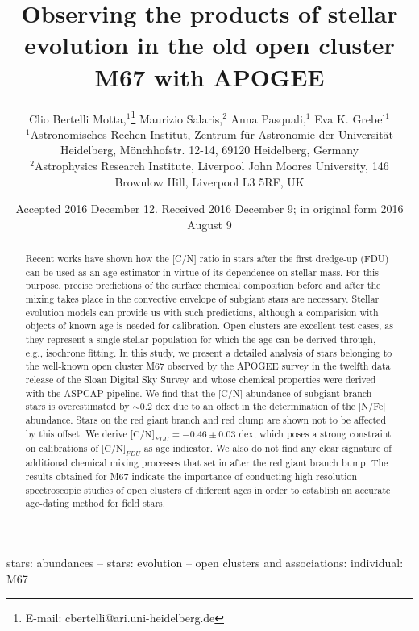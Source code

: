\documentclass[a4paper,fleqn,usenatbib]{mnras}
\title[Products of stellar evolution in M67]{Observing the products of stellar evolution in the old open cluster M67 with APOGEE}
\author[Bertelli Motta et al.]{
Clio Bertelli Motta,$^{1}$\thanks{E-mail: cbertelli@ari.uni-heidelberg.de}
Maurizio Salaris,$^{2}$
Anna Pasquali,$^{1}$
Eva K. Grebel$^{1}$
\\
$^{1}$Astronomisches Rechen-Institut, Zentrum f\"ur Astronomie der Universit\"at Heidelberg, M\"onchhofstr. 12-14, 69120 Heidelberg, Germany\\
$^{2}$Astrophysics Research Institute, Liverpool John Moores University, 146 Brownlow Hill, Liverpool L3 5RF, UK\\
}
\date{Accepted 2016 December 12. Received 2016 December 9; in original form 2016 August 9}
\begin{document}
\label{firstpage}
\pagerange{\pageref{firstpage}--\pageref{lastpage}}
\maketitle

\begin{abstract}
Recent works have shown how the [C/N] ratio in stars after the first dredge-up (FDU) can be used as an age estimator in virtue of its dependence on stellar mass. For this purpose, precise predictions of the surface chemical composition before and after the mixing takes place in the convective envelope of subgiant stars are necessary. Stellar evolution models can provide us with such predictions, although a comparision with objects of known age is needed for calibration. Open clusters are excellent test cases, as they represent a single stellar population for which the age can be derived through, e.g., isochrone fitting. In this study, we present a detailed analysis of stars belonging to the well-known open cluster M67 observed by the APOGEE survey in the twelfth data release of the Sloan Digital Sky Survey and whose chemical properties were derived with the ASPCAP pipeline. We find that the [C/N] abundance of subgiant branch stars is overestimated by $\sim0.2$ dex due to an offset in the determination of the [N/Fe] abundance. Stars on the red giant branch and red clump are shown not to be affected by this offset. We derive $\text{[C/N]}_{FDU}=-0.46\pm 0.03$ dex, which poses a strong constraint on calibrations of $\text{[C/N]}_{FDU}$
as age indicator. We also do not find any clear signature of additional chemical mixing processes that set in after the red giant branch bump. The results obtained for M67 indicate the importance of conducting high-resolution spectroscopic studies of open clusters of different ages in order to establish an accurate age-dating method for field stars.
\end{abstract}

\begin{keywords}
stars: abundances -- stars: evolution -- open clusters and associations: individual: M67 
\end{keywords}


\end{document}

